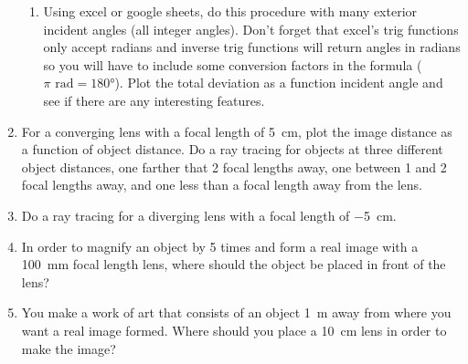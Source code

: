 \begin{enumerate}
\begin{enumerate}
	\item Using excel or google sheets, do this procedure with many exterior incident angles (all integer angles). Don't forget that excel's trig functions only accept radians and inverse trig functions will return angles in radians so you will have to include some conversion factors in the formula ($\pi \,\, \si{\radian} = \ang{180}$). Plot the total deviation as a function incident angle and see if there are any interesting features.
	 
\end{enumerate}

\newpage
\item
For a converging lens with a focal length of \SI{+5}{cm}, plot the image distance as a function of object distance. Do a ray tracing for objects at three different object distances, one farther that 2 focal lengths away, one between 1 and 2 focal lengths away, and one less than a focal length away from the lens. 

\newpage
\item
Do a ray tracing for a diverging lens with a focal length of \SI{-5}{cm}. 

\item
In order to magnify an object by 5 times and form a real image with a \SI{100}{mm} focal length lens, where should the object be placed in front of the lens?

\item
You make a work of art that consists of an object \SI{1}{\meter} away from where you want a real image formed. Where should you place a \SI{10}{cm} lens in order to make the image?

\newpage 

\ %

\newpage

\end{enumerate}